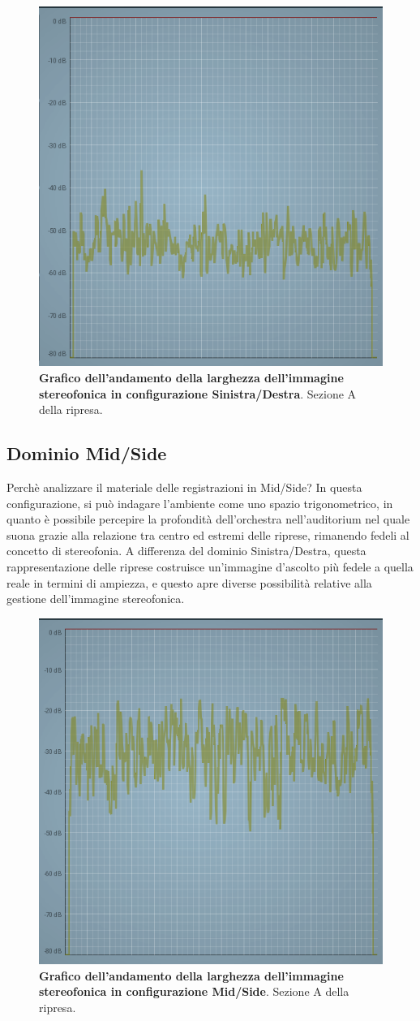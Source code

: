 	\begin{figure}[h]
		\begin{center}
			\includegraphics[width=.47\textwidth]{img/image3.png}
			\caption{\textbf{Grafico dell'andamento della larghezza dell'immagine stereofonica in configurazione Sinistra/Destra}. Sezione A della ripresa.}
			\label{gr01}
		\end{center}
	\end{figure}
	
	\subsection*{Dominio Mid/Side}
	Perchè analizzare il materiale delle registrazioni in Mid/Side?
	In questa configurazione, si può indagare l'ambiente come uno spazio trigonometrico, in quanto è possibile percepire la profondità dell'orchestra nell'auditorium nel quale suona grazie alla relazione tra centro ed estremi delle riprese, rimanendo fedeli al concetto di stereofonia.
	A differenza del dominio Sinistra/Destra, questa rappresentazione delle riprese costruisce un'immagine d'ascolto più fedele a quella reale in termini di ampiezza, e questo apre diverse possibilità relative alla gestione dell'immagine stereofonica.
	
	\begin{figure}[h]
		\begin{center}
			\includegraphics[width=.47\textwidth]{img/image4.png}
			\caption{\textbf{Grafico dell'andamento della larghezza dell'immagine stereofonica in configurazione Mid/Side}. Sezione A della ripresa.}
			\label{gr01}
		\end{center}
	\end{figure}
	
